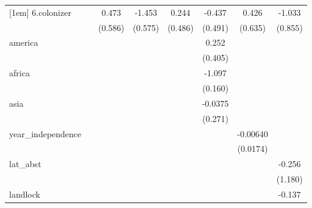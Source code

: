 {\begin{tabular}{l*{7}{c}}
[1em]
6.colonizer &                     &       0.473         &      -1.453\sym{**} &       0.244         &      -0.437         &       0.426         &      -1.033         \\
            &                     &     (0.586)         &     (0.575)         &     (0.486)         &     (0.491)         &     (0.635)         &     (0.855)         \\
[1em]
america     &                     &                     &                     &                     &       0.252         &                     &                     \\
            &                     &                     &                     &                     &     (0.405)         &                     &                     \\
[1em]
africa      &                     &                     &                     &                     &      -1.097\sym{***}&                     &                     \\
            &                     &                     &                     &                     &     (0.160)         &                     &                     \\
[1em]
asia        &                     &                     &                     &                     &     -0.0375         &                     &                     \\
            &                     &                     &                     &                     &     (0.271)         &                     &                     \\
[1em]
year\_independence&                     &                     &                     &                     &                     &    -0.00640         &                     \\
            &                     &                     &                     &                     &                     &    (0.0174)         &                     \\
[1em]
lat\_abst    &                     &                     &                     &                     &                     &                     &      -0.256         \\
            &                     &                     &                     &                     &                     &                     &     (1.180)         \\
[1em]
landlock    &                     &                     &                     &                     &                     &                     &      -0.137         \\

\end{tabular}}
